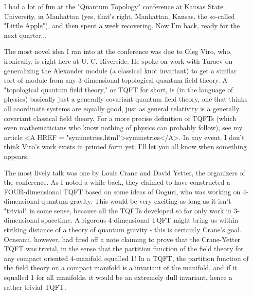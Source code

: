 


I had a lot of fun at the "Quantum Topology" conference at Kansas State
University, in Manhattan (yes, that's right, Manhattan, Kansas, the
so-called "Little Apple"), and then spent a week recovering.  Now I'm
back, ready for the next quarter...

The most novel idea I ran into at the conference was due to Oleg Viro,
who, ironically, is right here at U. C. Riverside.  He spoke on work
with Turaev on generalizing the Alexander module (a classical knot
invariant) to get a similar sort of module from any 3-dimensional
topological quantum field theory.  A "topological quantum field theory,"
or TQFT for short, is (in the language of physics) basically just a
generally covariant quantum field theory, one that thinks all coordinate
systems are equally good, just as general relativity is a generally
covariant classical field theory.  For a more precise definition of
TQFTs (which even mathematicians who know nothing of physics can
probably follow), see my article <A HREF = "symmetries.html">symmetries</A>. 
In any event, I don't
think Viro's work exists in printed form yet; I'll let you all know when
something appears. 

The most lively talk was one by Louis Crane and David Yetter, the
organizers of the conference.  As I noted a while back, they claimed to
have constructed a FOUR-dimensional TQFT based on some ideas of Ooguri,
who was working on 4-dimensional quantum gravity.   This would be
very exciting as long as it isn't "trivial" in some sense, because all
the TQFTs developed so far only work in 3-dimensional spacetime.
A rigorous 4-dimensional TQFT might bring us within striking distance of
a theory of quantum gravity - this is certainly Crane's goal.  Ocneanu,
however, had fired off a note claiming to prove that the Crane-Yetter
TQFT was trivial, in the sense that the partition function of the field
theory for any compact oriented 4-manifold equalled 1!  In a TQFT, the
partition function of the field theory on a compact manifold is a
invariant of the manifold, and if it equalled 1 for all manifolds, it
would be an extremely dull invariant, hence a rather trivial TQFT.

